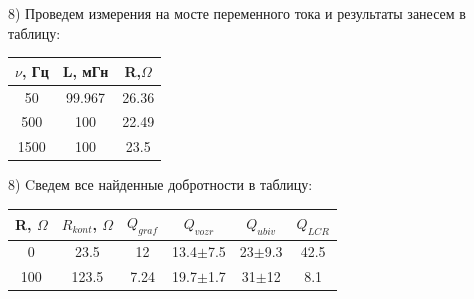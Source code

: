 \documentclass[a4paper,12pt]{article} %
\begin{document}
8) Проведем измерения на мосте переменного тока и результаты занесем в таблицу: \\
\begin{center}


\begin{tabular}{|c|c|c|}
\hline 
$\nu$, Гц & L, мГн & R,$\Omega$ \\ 
\hline 
50 & 99.967 & 26.36 \\ 
\hline 
500 & 100 & 22.49 \\ 
\hline 
1500 & 100 & 23.5 \\ 
\hline 
\end{tabular} 
\end{center}	 
8) Cведем все найденные добротности в таблицу: \\
\begin{center}
\begin{tabular}{|c|c|c|c|c|c|}
\hline 
R, $\Omega$ & $R_{kont}$, $\Omega$ & $Q_{graf}$ & $Q_{vozr}$ & $Q_{ubiv}$ & $Q_{LCR}$ \\ 
\hline 
0 & 23.5 & 12 & 13.4$\pm$7.5 & 23$\pm$9.3 & 42.5 \\ 
\hline 
100 & 123.5 & 7.24 & 19.7$\pm$1.7 & 31$\pm$12 & 8.1 \\ 
\hline 
\end{tabular} 

\end{center}
\end{document}
